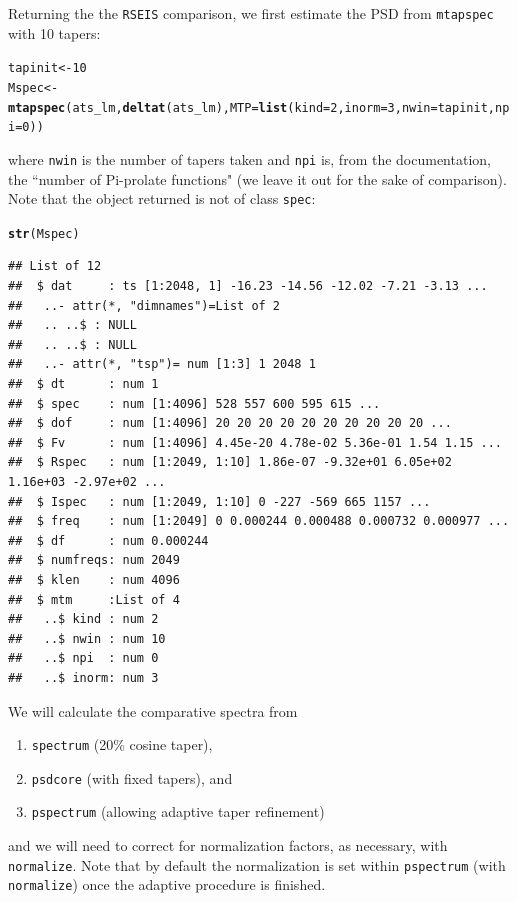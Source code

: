 \documentclass[10pt]{article}\usepackage[]{graphicx}\usepackage[]{color}
\makeatletter
\newcommand{\hlnum}[1]{\textcolor[rgb]{0.686,0.059,0.569}{#1}}%
\newcommand{\hlstd}[1]{\textcolor[rgb]{0.345,0.345,0.345}{#1}}%
\newcommand{\hlkwb}[1]{\textcolor[rgb]{0.69,0.353,0.396}{#1}}%
\newcommand{\hlkwc}[1]{\textcolor[rgb]{0.333,0.667,0.333}{#1}}%
\newcommand{\hlkwd}[1]{\textcolor[rgb]{0.737,0.353,0.396}{\textbf{#1}}}%
\newenvironment{kframe}{%
 \def\at@end@of@kframe{}%
 \ifinner\ifhmode%
  \def\at@end@of@kframe{\end{minipage}}%
  \begin{minipage}{\columnwidth}%
 \fi\fi%
 \def\FrameCommand##1{\hskip\@totalleftmargin \hskip-\fboxsep
 \colorbox{shadecolor}{##1}\hskip-\fboxsep
     \hskip-\linewidth \hskip-\@totalleftmargin \hskip\columnwidth}%
 \MakeFramed {\advance\hsize-\width
   \@totalleftmargin\z@ \linewidth\hsize
   \@setminipage}}%
 {\par\unskip\endMakeFramed%
 \at@end@of@kframe}
\newenvironment{knitrout}{}{} %
\newcommand{\Rcmd}[1]{\texttt{#1}}
\makeatother
\begin{document}
Returning the the \Rcmd{RSEIS} comparison, we first 
estimate the PSD from \Rcmd{mtapspec} with 10 tapers:
\begin{knitrout}
\color{fgcolor}\begin{kframe}
\begin{alltt}
\hlstd{tapinit} \hlkwb{<-} \hlnum{10}
\hlstd{Mspec} \hlkwb{<-} \hlkwd{mtapspec}\hlstd{(ats_lm,} \hlkwd{deltat}\hlstd{(ats_lm),} \hlkwc{MTP}\hlstd{=}\hlkwd{list}\hlstd{(}\hlkwc{kind}\hlstd{=}\hlnum{2}\hlstd{,} \hlkwc{inorm}\hlstd{=}\hlnum{3}\hlstd{,} \hlkwc{nwin}\hlstd{=tapinit,} \hlkwc{npi}\hlstd{=}\hlnum{0}\hlstd{))}
\end{alltt}
\end{kframe}
\end{knitrout}
where \Rcmd{nwin} is the number of tapers taken and
\Rcmd{npi} is, from the documentation, the ``number of Pi-prolate functions" (we
leave it out for the sake of comparison). 
Note that the object returned
is not of class \Rcmd{spec}:
\begin{knitrout}
\color{fgcolor}\begin{kframe}
\begin{alltt}
\hlkwd{str}\hlstd{(Mspec)}
\end{alltt}
\begin{verbatim}
## List of 12
##  $ dat     : ts [1:2048, 1] -16.23 -14.56 -12.02 -7.21 -3.13 ...
##   ..- attr(*, "dimnames")=List of 2
##   .. ..$ : NULL
##   .. ..$ : NULL
##   ..- attr(*, "tsp")= num [1:3] 1 2048 1
##  $ dt      : num 1
##  $ spec    : num [1:4096] 528 557 600 595 615 ...
##  $ dof     : num [1:4096] 20 20 20 20 20 20 20 20 20 20 ...
##  $ Fv      : num [1:4096] 4.45e-20 4.78e-02 5.36e-01 1.54 1.15 ...
##  $ Rspec   : num [1:2049, 1:10] 1.86e-07 -9.32e+01 6.05e+02 1.16e+03 -2.97e+02 ...
##  $ Ispec   : num [1:2049, 1:10] 0 -227 -569 665 1157 ...
##  $ freq    : num [1:2049] 0 0.000244 0.000488 0.000732 0.000977 ...
##  $ df      : num 0.000244
##  $ numfreqs: num 2049
##  $ klen    : num 4096
##  $ mtm     :List of 4
##   ..$ kind : num 2
##   ..$ nwin : num 10
##   ..$ npi  : num 0
##   ..$ inorm: num 3
\end{verbatim}
\end{kframe}
\end{knitrout}

We will calculate the comparative spectra
from
\begin{enumerate}
  \item \Rcmd{spectrum} (20\% cosine taper),
  \item \Rcmd{psdcore} (with fixed tapers), and
  \item \Rcmd{pspectrum} (allowing adaptive taper refinement)
\end{enumerate}
and we will need to correct for normalization factors, as necessary, with
\Rcmd{normalize}. Note that by default the normalization is
set within \Rcmd{pspectrum} (with \Rcmd{normalize}) once the adaptive procedure
is finished.
\end{document}
